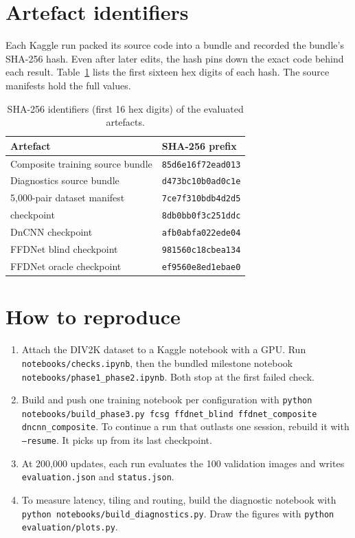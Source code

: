 \section{Artefact identifiers}

Each Kaggle run packed its source code into a bundle and recorded the
bundle's SHA-256 hash. Even after later edits, the hash pins down the exact
code behind each result. Table~\ref{tab:hashes} lists the first sixteen hex
digits of each hash. The source manifests hold the full values.

\begin{table}[htbp]
	\centering
	\caption{SHA-256 identifiers (first 16 hex digits) of the evaluated artefacts.}
	\label{tab:hashes}
	\small
	\begin{tabular}{@{}ll@{}}
		\toprule
		Artefact & SHA-256 prefix \\
		\midrule
		Composite training source bundle & \texttt{85d6e16f72ead013} \\
		Diagnostics source bundle        & \texttt{d473bc10b0ad0c1e} \\
		5,000-pair dataset manifest      & \texttt{7ce7f310bdb4d2d5} \\
		\fcsg{} checkpoint               & \texttt{8db0bb0f3c251ddc} \\
		DnCNN checkpoint                 & \texttt{afb0abfa022ede04} \\
		FFDNet blind checkpoint          & \texttt{981560c18cbea134} \\
		FFDNet oracle checkpoint         & \texttt{ef9560e8ed1ebae0} \\
		\bottomrule
	\end{tabular}
\end{table}

\section{How to reproduce}

\begin{enumerate}
	\item Attach the DIV2K dataset to a Kaggle notebook with a GPU. Run
	\texttt{notebooks/checks.ipynb}, then the bundled milestone notebook
	\texttt{notebooks/phase1\_phase2.ipynb}. Both stop at the first failed
	check.
	\item Build and push one training notebook per configuration with
	\texttt{python notebooks/build\_phase3.py fcsg ffdnet\_blind
	ffdnet\_composite dncnn\_composite}. To continue a run that outlasts one
	session, rebuild it with \texttt{--resume}. It picks up from its last
	checkpoint.
	\item At 200,000 updates, each run evaluates the 100 validation images and
	writes \texttt{evaluation.json} and \texttt{status.json}.
	\item To measure latency, tiling and routing, build the diagnostic notebook
	with \texttt{python notebooks/build\_diagnostics.py}. Draw the figures with
	\texttt{python evaluation/plots.py}.
\end{enumerate}
